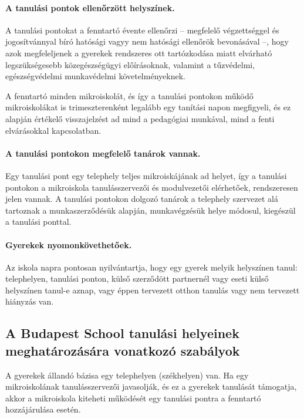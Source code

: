 \paragraph{A tanulási pontok ellenőrzött helyszínek.}

A tanulási pontokat a fenntartó évente ellenőrzi -- megfelelő végzettséggel és jogosítvánnyal bíró hatósági vagyy nem hatósági ellenőrök bevonásával --, hogy azok megfeleljenek a gyerekek rendszeres ott tartózkodása miatt elvárható legszükségesebb közegészségügyi előírásoknak, valamint a tűzvédelmi, egészségvédelmi  munkavédelmi követelményeknek.

A fenntartó minden mikroiskolát, és így a tanulási pontokon működő mikroiskolákat is trimeszterenként legalább egy tanítási napon megfigyeli, és ez alapján értékelő visszajelzést ad mind a pedagógiai munkával, mind a fenti elvárásokkal kapcsolatban.

\paragraph{A tanulási pontokon megfelelő tanárok vannak.}

Egy tanulási pont egy telephely teljes mikroiskájának ad helyet, így a tanulási pontokon a mikroiskola tanulásszervezői és modulvezetői elérhetőek, rendszeresen jelen vannak. A tanulási pontokon dolgozó tanárok a telephely szervezet alá tartoznak a munkaszerződésük alapján, munkavégzésük helye módosul, kiegészül a tanulási ponttal.

\paragraph{Gyerekek nyomonkövethetőek.}

Az iskola napra pontosan nyilvántartja,\linebreak
hogy egy gyerek melyik helyszínen tanul: telephelyen, tanulási ponton,
külső szerződött partnernél vagy eseti külső helyszínen tanul-e
aznap,\linebreak
vagy éppen tervezett otthon tanulás vagy nem tervezett hiányzás van.

\subsection{A Budapest School tanulási helyeinek meghatározására vonatkozó szabályok}
A gyerekek állandó bázisa egy telephelyen (székhelyen) van. Ha egy mikroiskolának tanulásszervezői javasolják, és ez a gyerekek tanulását támogatja, akkor a mikroiskola kiteheti működését egy tanulási pontra a fenntartó hozzájárulása esetén.

